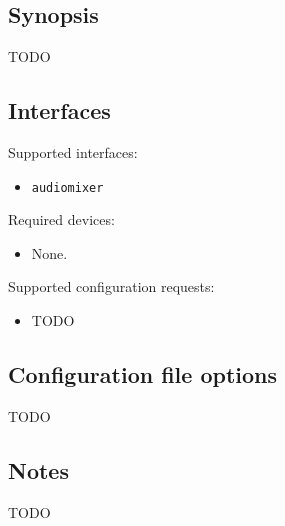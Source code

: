 
\subsection*{Synopsis}

TODO


\subsection*{Interfaces}

\noindent Supported interfaces:

\begin{itemize}
\item {\tt audiomixer}
\end{itemize}

\noindent Required devices:
\begin{itemize}
\item None.
\end{itemize}

\noindent Supported configuration requests:
\begin{itemize}
\item TODO
\end{itemize}


\subsection*{Configuration file options}

TODO

\subsection*{Notes}

TODO
